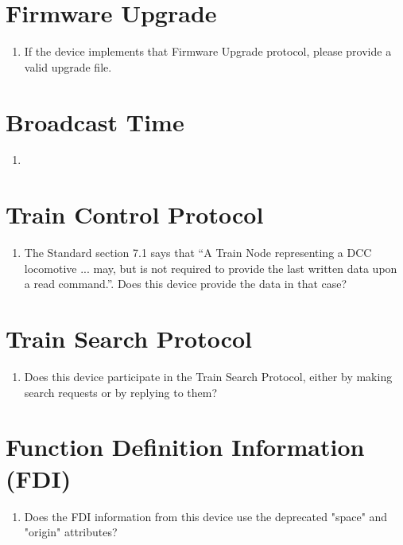 \section{Firmware Upgrade}
\begin{enumerate}
    \item If the device implements that Firmware Upgrade protocol,
            please provide a valid upgrade file.
\end{enumerate}

\section{Broadcast Time}
\begin{enumerate}
    \item 
\end{enumerate}

\section{Train Control Protocol}
\begin{enumerate}
    \item The Standard section 7.1 says that
        ``A Train Node representing a DCC locomotive ... may, 
        but is not required to provide the last written data upon a read command.''.
        Does this device provide the data in that case?
\end{enumerate}

\section{Train Search Protocol}
\begin{enumerate}
    \item Does this device participate in the Train Search Protocol, 
            either by making search requests or by replying to them?
\end{enumerate}

\section{Function Definition Information (FDI)}
\begin{enumerate}
    \item Does the FDI information from this device use the 
        deprecated "space" and "origin" attributes?
\end{enumerate}


  
